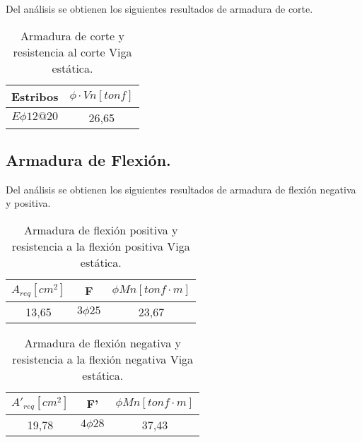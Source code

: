         Del análisis se obtienen los siguientes resultados de armadura de corte.
        
        \begin{table}[H]
          \centering
          \caption{Armadura de corte y resistencia al corte Viga estática.}
            \begin{tabular}{cc}
            \hline
            \textbf{Estribos} & \boldmath{}\textbf{$\phi \cdot Vn [tonf]$}\unboldmath{} \bigstrut\\
            \hline
            $E \phi 12 @ 20$ & 26,65 \bigstrut\\
            \hline
            \end{tabular}%
          \label{arm-corte-estatica}%
        \end{table}%
    
    \subsection{Armadura de Flexión.}
    
        Del análisis se obtienen los siguientes resultados de armadura de flexión negativa y positiva.
        
        \begin{table}[htbp]
          \centering
          \caption{Armadura de flexión positiva y resistencia a la flexión positiva Viga estática.}
            \begin{tabular}{ccc}
            \hline
            \boldmath{}\textbf{$A_{req} [cm^2]$}\unboldmath{} & \textbf{F} & \boldmath{}\textbf{$\phi Mn [tonf \cdot m]$}\unboldmath{} \bigstrut\\
            \hline
            13,65 & $3 \phi 25$ & 23,67 \bigstrut\\
            \hline
            \end{tabular}%
          \label{flex+estatica}%
        \end{table}%
        
        \begin{table}[htbp]
          \centering
          \caption{Armadura de flexión negativa y resistencia a la flexión negativa Viga estática.}
            \begin{tabular}{ccc}
            \hline
            \boldmath{}\textbf{$A'_{req} [cm^2]$}\unboldmath{} & \textbf{F'} & \boldmath{}\textbf{$\phi Mn [tonf \cdot m]$}\unboldmath{} \bigstrut\\
            \hline
            19,78 & $4 \phi 28$ & 37,43 \bigstrut\\
            \hline
            \end{tabular}%
          \label{flex-estatica}%
        \end{table}%

